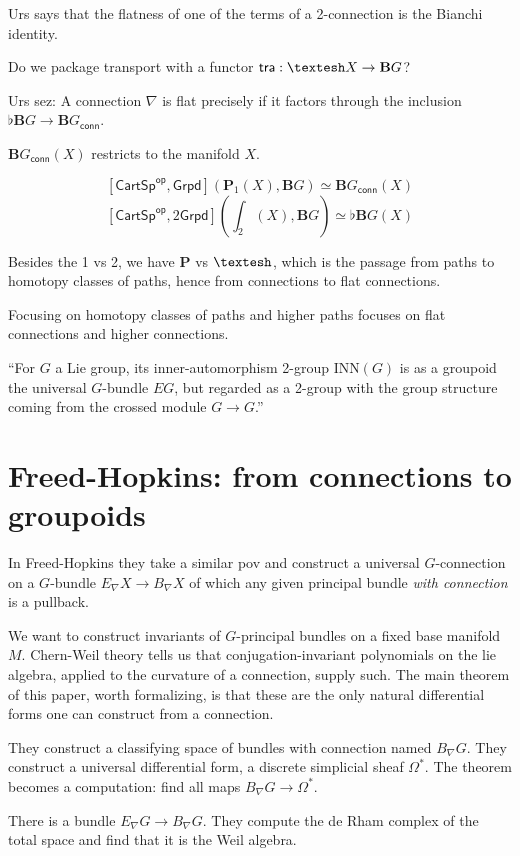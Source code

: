 \documentclass[12pt]{article}
\newcommand{\cart}{\textsf{CartSp}}
\newcommand{\shape}{\ensuremath{\text{\textesh}}}
\newcommand{\op}[1]{#1^{\textsf{op}}}
\newcommand{\bg}{\ensuremath{\textbf{B}G}}
\newcommand{\bgconn}{\ensuremath{\textbf{B}G_{\textsf{conn}}}}
\begin{document}
Urs says that the flatness of one of the terms of a 2-connection is the Bianchi identity.

Do we package transport with a functor $\mathsf{tra}:\shape X\to \bg$?

Urs sez: A connection $\nabla$ is flat precisely if it factors through the inclusion $\flat \bg \to \bgconn$.

$\bgconn(X)$ restricts to the manifold $X$.

$$\left[ \op{\cart}, \mathsf{Grpd} \right](\textbf{P}_1(X), \bg) \simeq \bgconn(X)$$
$$\left[ \op{\cart}, 2\mathsf{Grpd} \right](\textstyle\int_2(X), \bg) \simeq \flat\bg(X)$$

Besides the 1 vs 2, we have $\textbf{P}$ vs $\shape$, which is the passage from paths to homotopy classes of paths, hence from connections to flat connections.

Focusing on homotopy classes of paths and higher paths focuses on flat connections and higher connections.

``For $G$ a Lie group, its inner-automorphism 2-group $\mathrm{INN}(G)$ is as a groupoid the universal $G$-bundle $EG$, but regarded as a 2-group with the group structure coming from the crossed module $G\to G$.''

\section{Freed-Hopkins: from connections to groupoids}
In Freed-Hopkins \cite{freed2013chernweil} they take a similar pov and construct a universal $G$-connection on a $G$-bundle $E_{\nabla}X\to B_{\nabla}X$ of which any given principal bundle \emph{with connection} is a pullback.

We want to construct invariants of $G$-principal bundles on a fixed base manifold $M$. Chern-Weil theory tells us that conjugation-invariant polynomials on the lie algebra, applied to the curvature of a connection, supply such. The main theorem of this paper, worth formalizing, is that these are the only natural differential forms one can construct from a connection.

They construct a classifying space of bundles with connection named $B_{\nabla}G$. They construct a universal differential form, a discrete simplicial sheaf $\Omega^{*}$. The theorem becomes a computation: find all maps $B_{\nabla}G \to \Omega^{*}.$

There is a bundle $E_{\nabla}G \to B_{\nabla}G$. They compute the de Rham complex of the total space and find that it is the Weil algebra.
\end{document}
